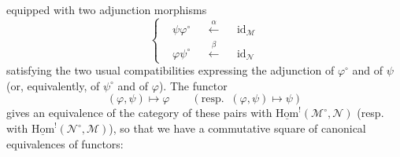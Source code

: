 \documentclass[11pt]{article}
\newcommand{\uHom}{\underline{\mathrm{Hom}}}
\begin{document}
equipped with two adjunction morphisms
\[
\left\{
\begin{aligned}
&\psi\varphi^\circ &&\xleftarrow{\alpha} &&\mathrm{id}_{\mathcal{M}}\\
&\varphi\psi^\circ &&\xleftarrow{\beta} &&\mathrm{id}_{\mathcal{N}}
\end{aligned}
\right.
\tag*{(4.1.15)}
\]
satisfying the two usual compatibilities expressing the adjunction of $\varphi^\circ$ and of $\psi$ (or, equivalently, of $\psi^\circ$ and of $\varphi$). The functor
\[
(\varphi,\psi) \longmapsto \varphi \qquad (\text{resp.}\;\; (\varphi,\psi) \longmapsto \psi)
\]
gives an equivalence of the category of these pairs with $\uHom^!(\mathcal{M}^\circ,\mathcal{N})$ (resp. with $\uHom^!(\mathcal{N}^\circ,\mathcal{M})$), so that we have a commutative square of canonical equivalences of functors:
\end{document}
